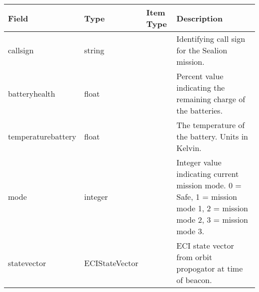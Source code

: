 
\begin{tabular}{ | m{3cm} | m{1cm}| m{1cm} | m{4cm} | } 
  \hline
  \textbf{Field} & \textbf{Type} & \textbf{Item Type} & \textbf{Description} \\
  \hline
  callsign & string &  & Identifying call sign for the Sealion mission. \\
  \hline
  batteryhealth & float &  & Percent value indicating the remaining charge of the batteries. \\
  \hline
  temperaturebattery & float &  & The temperature of the battery. Units in Kelvin. \\
  \hline
  mode & integer &  & Integer value indicating current mission mode. 0 = Safe, 1 = mission mode 1, 2 = mission mode 2, 3 = mission mode 3. \\
  \hline
  statevector & ECIStateVector &  & ECI state vector from orbit propogator at time of beacon. \\
  \hline
  
\end{tabular}
